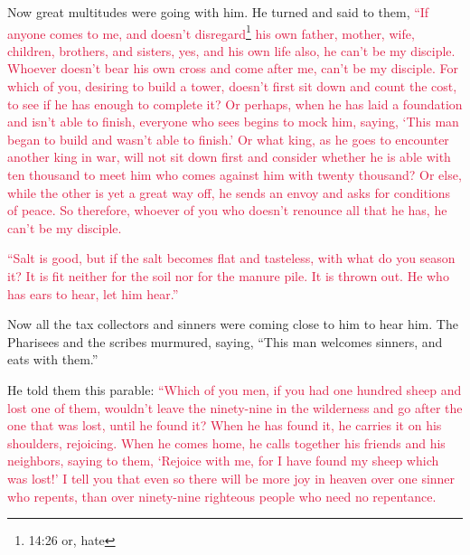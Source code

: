 \myverse{}Now great multitudes were going with him. He turned and said
to them,
\myverse{}\textcolor{crimson}{“If anyone comes to me, and doesn’t disregard}\footnote{14:26 or, hate
}
\textcolor{crimson}{his own father, mother, wife, children, brothers, and sisters, yes, and his own life also, he can’t
	be my disciple.
}
\myverse{}\textcolor{crimson}{Whoever doesn’t bear his own cross and come after me, can’t be my disciple.
}
\myverse{}\textcolor{crimson}{For which of you, desiring to build a tower, doesn’t first sit down and
	count the cost, to see if he has enough to complete it?
}
\myverse{}\textcolor{crimson}{Or perhaps, when he has laid a foundation and isn’t able to finish, everyone
	who sees begins to mock him,
}
\myverse{}\textcolor{crimson}{saying, ‘This man began to build and wasn’t able to finish.’
}
\myverse{}\textcolor{crimson}{Or what king, as he goes to encounter another king in war, will not sit
	down first and consider whether he is able with ten thousand to meet him who comes against him with twenty
	thousand?
}
\myverse{}\textcolor{crimson}{Or else, while the other is yet a great way off, he sends an envoy and
	asks for conditions of peace.
}
\myverse{}\textcolor{crimson}{So therefore, whoever of you who doesn’t renounce all that he has, he
	can’t be my disciple.}

\myverse{}\textcolor{crimson}{“Salt is good, but if the salt becomes flat and tasteless,
	with what do you season it?
}
\myverse{}\textcolor{crimson}{It is fit neither for the soil nor for the manure pile. It is thrown
	out. He who has ears to hear, let him hear.”}


\mychapter{} \myverse*{}Now all the tax collectors and sinners were coming close to him
to hear him.
\myverse{}The Pharisees and the scribes murmured, saying, “This man welcomes sinners,
and eats with them.”

\myverse{}He told them this parable:
\myverse{}\textcolor{crimson}{“Which of you men, if you had one hundred sheep and lost one of them, wouldn’t
	leave the ninety-nine in the wilderness and go after the one that was lost, until he found it?
}
\myverse{}\textcolor{crimson}{When he has found it, he carries it on his shoulders, rejoicing.
}
\myverse{}\textcolor{crimson}{When he comes home, he calls together his friends and his neighbors, saying
	to them, ‘Rejoice with me, for I have found my sheep which was lost!’
}
\myverse{}\textcolor{crimson}{I tell you that even so there will be more joy in heaven over one sinner
	who repents, than over ninety-nine righteous people who need no repentance.
}

